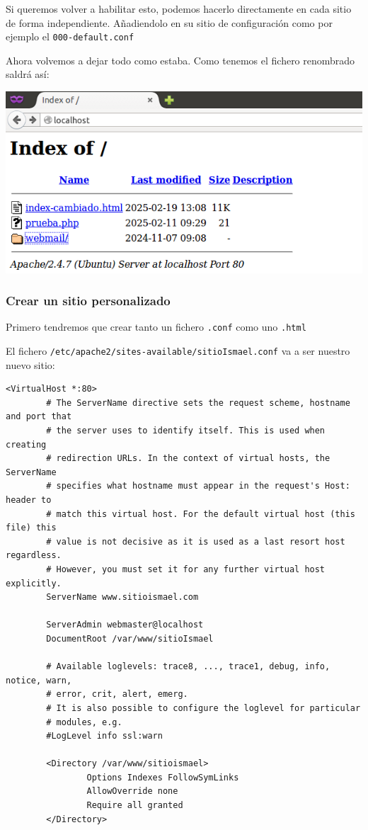 \documentclass[11pt]{article}
\begin{document}
Si queremos volver a habilitar esto, podemos hacerlo directamente en cada sitio de forma independiente. Añadiendolo en su sitio de configuración como por ejemplo el \texttt{000-default.conf}

Ahora volvemos a dejar todo como estaba. Como tenemos el fichero renombrado saldrá así:

\begin{center}
\includegraphics[width=.9\linewidth]{./media/apache-4.png}
\end{center}
\subsubsection{Crear un sitio personalizado}
\label{sec:org863732b}
Primero tendremos que crear tanto un fichero \texttt{.conf} como uno \texttt{.html}

El fichero \texttt{/etc/apache2/sites-available/sitioIsmael.conf} va a ser nuestro nuevo sitio:
\begin{verbatim}
<VirtualHost *:80>
        # The ServerName directive sets the request scheme, hostname and port that
        # the server uses to identify itself. This is used when creating
        # redirection URLs. In the context of virtual hosts, the ServerName
        # specifies what hostname must appear in the request's Host: header to
        # match this virtual host. For the default virtual host (this file) this
        # value is not decisive as it is used as a last resort host regardless.
        # However, you must set it for any further virtual host explicitly.
        ServerName www.sitioismael.com

        ServerAdmin webmaster@localhost
        DocumentRoot /var/www/sitioIsmael

        # Available loglevels: trace8, ..., trace1, debug, info, notice, warn,
        # error, crit, alert, emerg.
        # It is also possible to configure the loglevel for particular
        # modules, e.g.
        #LogLevel info ssl:warn

        <Directory /var/www/sitioismael>
                Options Indexes FollowSymLinks
                AllowOverride none
                Require all granted
        </Directory>
\end{verbatim}
\end{document}
